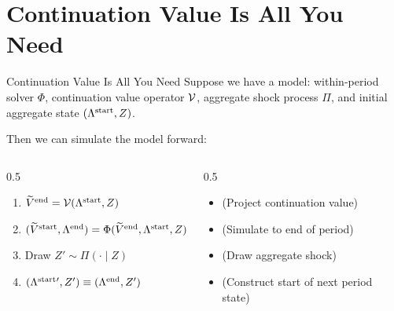\documentclass[10pt,aspectratio=169]{beamer}
\begin{document}
\section[CVIAYN]{Continuation Value Is All You Need}

\begin{frame}{Continuation Value Is All You Need}
  Suppose we have a model: within-period solver $\Phi$, continuation value operator $\mathcal{V}$, aggregate shock process $\Pi$, and initial aggregate state $(\Lambda^{\mathrm{start}}, Z)$.
  
  Then we can simulate the model forward:
  \begin{columns}
    \begin{column}[T]{0.5\textwidth}
      \begin{enumerate}
        \item $\widetilde{V}^{\mathrm{end}} = \mathcal{V}(\Lambda^{\mathrm{start}}, Z)$
        \item $(\widetilde{V}^{\mathrm{start}}, \Lambda^{\mathrm{end}}) = \Phi(\widetilde{V}^{\mathrm{end}}, \Lambda^{\mathrm{start}}, Z)$
        \item Draw $Z' \sim \Pi(\cdot \mid Z)$
        \item $(\Lambda^{\mathrm{start}}{}', Z') \equiv (\Lambda^{\mathrm{end}}, Z')$
      \end{enumerate}
    \end{column}
    \begin{column}[T]{0.5\textwidth}
      \begin{itemize}
        \item[] (Project continuation value)
        \item[] (Simulate to end of period)
        \item[] (Draw aggregate shock)
        \item[] (Construct start of next period state)
      \end{itemize}
    \end{column}
  \end{columns}
\end{frame}
\end{document}

